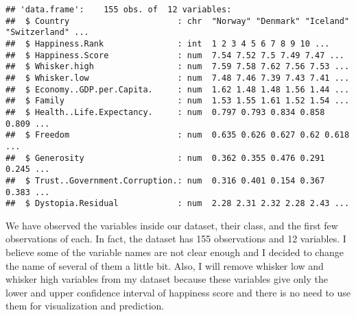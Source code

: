 \documentclass[
]{article}
\begin{document}
\begin{verbatim}
## 'data.frame':    155 obs. of  12 variables:
##  $ Country                      : chr  "Norway" "Denmark" "Iceland" "Switzerland" ...
##  $ Happiness.Rank               : int  1 2 3 4 5 6 7 8 9 10 ...
##  $ Happiness.Score              : num  7.54 7.52 7.5 7.49 7.47 ...
##  $ Whisker.high                 : num  7.59 7.58 7.62 7.56 7.53 ...
##  $ Whisker.low                  : num  7.48 7.46 7.39 7.43 7.41 ...
##  $ Economy..GDP.per.Capita.     : num  1.62 1.48 1.48 1.56 1.44 ...
##  $ Family                       : num  1.53 1.55 1.61 1.52 1.54 ...
##  $ Health..Life.Expectancy.     : num  0.797 0.793 0.834 0.858 0.809 ...
##  $ Freedom                      : num  0.635 0.626 0.627 0.62 0.618 ...
##  $ Generosity                   : num  0.362 0.355 0.476 0.291 0.245 ...
##  $ Trust..Government.Corruption.: num  0.316 0.401 0.154 0.367 0.383 ...
##  $ Dystopia.Residual            : num  2.28 2.31 2.32 2.28 2.43 ...
\end{verbatim}

We have observed the variables inside our dataset, their class, and the
first few observations of each. In fact, the dataset has 155
observations and 12 variables. I believe some of the variable names are
not clear enough and I decided to change the name of several of them a
little bit. Also, I will remove whisker low and whisker high variables
from my dataset because these variables give only the lower and upper
confidence interval of happiness score and there is no need to use them
for visualization and prediction.
\end{document}
